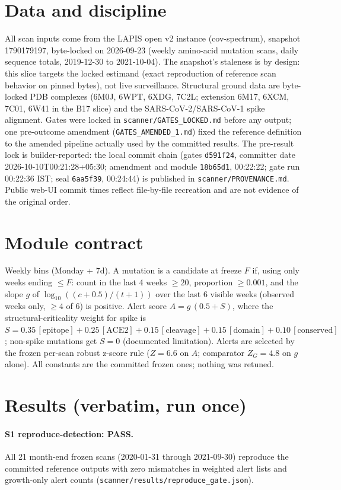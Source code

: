 \documentclass[11pt]{article}
\begin{document}
\section{Data and discipline}
All scan inputs come from the LAPIS open v2 instance (cov-spectrum),
snapshot 1790179197, byte-locked on 2026-09-23 (weekly amino-acid mutation
scans, daily sequence totals, 2019-12-30 to 2021-10-04). The snapshot's
staleness is by design: this slice targets the locked estimand (exact
reproduction of reference scan behavior on pinned bytes), not live
surveillance. Structural ground data are byte-locked PDB complexes
(6M0J, 6WPT, 6XDG, 7C2L; extension 6M17, 6XCM, 7C01, 6W41 in the B17 slice)
and the SARS-CoV-2/SARS-CoV-1 spike alignment. Gates were locked in
\texttt{scanner/GATES\_LOCKED.md} before any output; one pre-outcome amendment
(\texttt{GATES\_AMENDED\_1.md}) fixed the reference definition to the amended
pipeline actually used by the committed results. The pre-result lock is
builder-reported: the local commit chain (gates \texttt{d591f24}, committer
date 2026-10-10T00:21:28+05:30; amendment and module \texttt{18b65d1},
00:22:22; gate run 00:22:36 IST; seal \texttt{6aa5f39}, 00:24:44) is published
in \texttt{scanner/PROVENANCE.md}. Public web-UI commit times reflect
file-by-file recreation and are not evidence of the original order.

\section{Module contract}
Weekly bins (Monday + 7d). A mutation is a candidate at freeze $F$ if, using
only weeks ending $\le F$: count in the last 4 weeks $\ge 20$, proportion
$\ge 0.001$, and the slope $g$ of $\log_{10}((c+0.5)/(t+1))$ over the last 6
visible weeks (observed weeks only, $\ge 4$ of 6) is positive. Alert score
$A = g\,(0.5 + S)$, where the structural-criticality weight for spike is
$S = 0.35\,[\mathrm{epitope}] + 0.25\,[\mathrm{ACE2}] + 0.15\,[\mathrm{cleavage}]
+ 0.15\,[\mathrm{domain}] + 0.10\,[\mathrm{conserved}]$;
non-spike mutations get $S=0$ (documented limitation). Alerts are selected by
the frozen per-scan robust z-score rule ($Z=6.6$ on $A$; comparator $Z_G=4.8$
on $g$ alone). All constants are the committed frozen ones; nothing was retuned.

\section{Results (verbatim, run once)}
\paragraph{S1 reproduce-detection: PASS.} All 21 month-end frozen scans
(2020-01-31 through 2021-09-30) reproduce the committed reference outputs with
zero mismatches in weighted alert lists and growth-only alert counts
(\texttt{scanner/results/reproduce\_gate.json}).
\end{document}
